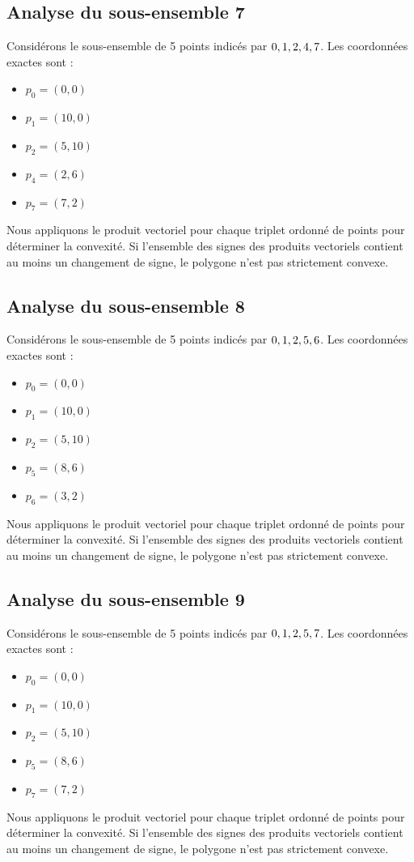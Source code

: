 \documentclass[11pt]{article}
\begin{document}
\subsection{Analyse du sous-ensemble 7}
Considérons le sous-ensemble de 5 points indicés par $\\{ 0, 1, 2, 4, 7 \\}$.
Les coordonnées exactes sont :
\begin{itemize}
\item $p_0 = (0, 0)$
\item $p_1 = (10, 0)$
\item $p_2 = (5, 10)$
\item $p_4 = (2, 6)$
\item $p_7 = (7, 2)$
\end{itemize}
Nous appliquons le produit vectoriel pour chaque triplet ordonné de points pour déterminer la convexité. Si l'ensemble des signes des produits vectoriels contient au moins un changement de signe, le polygone n'est pas strictement convexe.
\newpage

\subsection{Analyse du sous-ensemble 8}
Considérons le sous-ensemble de 5 points indicés par $\\{ 0, 1, 2, 5, 6 \\}$.
Les coordonnées exactes sont :
\begin{itemize}
\item $p_0 = (0, 0)$
\item $p_1 = (10, 0)$
\item $p_2 = (5, 10)$
\item $p_5 = (8, 6)$
\item $p_6 = (3, 2)$
\end{itemize}
Nous appliquons le produit vectoriel pour chaque triplet ordonné de points pour déterminer la convexité. Si l'ensemble des signes des produits vectoriels contient au moins un changement de signe, le polygone n'est pas strictement convexe.
\newpage

\subsection{Analyse du sous-ensemble 9}
Considérons le sous-ensemble de 5 points indicés par $\\{ 0, 1, 2, 5, 7 \\}$.
Les coordonnées exactes sont :
\begin{itemize}
\item $p_0 = (0, 0)$
\item $p_1 = (10, 0)$
\item $p_2 = (5, 10)$
\item $p_5 = (8, 6)$
\item $p_7 = (7, 2)$
\end{itemize}
Nous appliquons le produit vectoriel pour chaque triplet ordonné de points pour déterminer la convexité. Si l'ensemble des signes des produits vectoriels contient au moins un changement de signe, le polygone n'est pas strictement convexe.
\newpage
\end{document}
